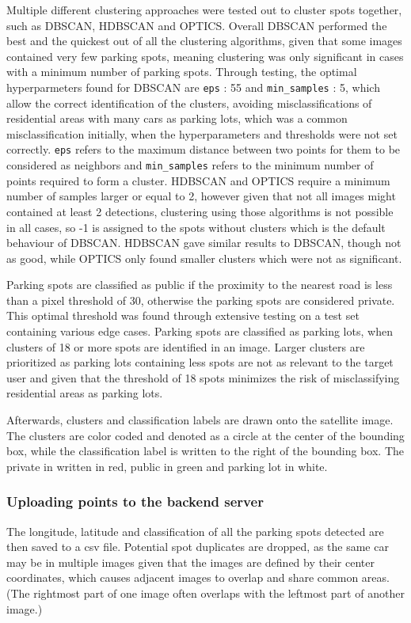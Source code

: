 Multiple different clustering approaches were tested out to cluster spots together, such as DBSCAN, HDBSCAN and OPTICS.
Overall DBSCAN performed the best and the quickest out of all the clustering algorithms, given that some images contained very few parking spots, meaning clustering was only significant in cases with a minimum number of parking spots.
Through testing, the optimal hyperparmeters found for DBSCAN are \texttt{eps} : 55 and \texttt{min\_samples} : 5, which allow the correct identification of the clusters, avoiding misclassifications of residential areas with many cars as parking lots, which was a common misclassification initially, when the hyperparameters and thresholds were not set correctly.
\texttt{eps} refers to the maximum distance between two points for them to be considered as neighbors and \texttt{min\_samples} refers to the minimum number of points required to form a cluster.
HDBSCAN and OPTICS require a minimum number of samples larger or equal to 2, however given that not all images might contained at least 2 detections, clustering using those algorithms is not possible in all cases, so -1 is assigned to the spots without clusters which is the default behaviour of DBSCAN.
HDBSCAN gave similar results to DBSCAN, though not as good, while OPTICS only found smaller clusters which were not as significant.

Parking spots are classified as public if the proximity to the nearest road is less than a pixel threshold of 30, otherwise the parking spots are considered private. This optimal threshold was found through extensive testing on a test set containing various edge cases.
Parking spots are classified as parking lots, when clusters of 18 or more spots are identified in an image. Larger clusters are prioritized as parking lots containing less spots are not as relevant to the target user and given that the threshold of 18 spots minimizes the risk of misclassifying residential areas as parking lots.

Afterwards, clusters and classification labels are drawn onto the satellite image. The clusters are color coded and denoted as a circle at the center of the bounding box, while the classification label is written to the right of the bounding box. The private in written in red, public in green and parking lot in white.

\subsubsection{Uploading points to the backend server}
The longitude, latitude and classification of all the parking spots detected are then saved to a csv file.
Potential spot duplicates are dropped, as the same car may be in multiple images given that the images are defined by their center coordinates, which causes adjacent images to overlap and share common areas. (The rightmost part of one image often overlaps with the leftmost part of another image.)

